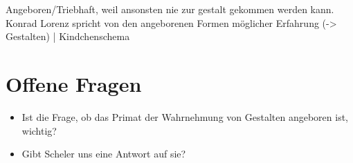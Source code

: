 \documentclass[a4paper, emulatestandardclasses]{scrartcl}
\begin{document}
Angeboren/Triebhaft, weil ansonsten nie zur gestalt gekommen werden kann. Konrad Lorenz spricht von den angeborenen Formen möglicher Erfahrung (-> Gestalten) | Kindchenschema
\newline



\section*{Offene Fragen}

\begin{itemize}
  \item Ist die Frage, ob das Primat der Wahrnehmung von Gestalten angeboren ist, wichtig?
  \item Gibt Scheler uns eine Antwort auf sie?
\end{itemize}




\end{document}
